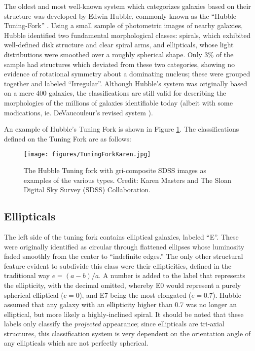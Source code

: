 The oldest and most well-known system which categorizes galaxies based on their structure was developed by Edwin Hubble, commonly known as the ``Hubble Tuning-Fork'' \citep{Hubble1926}. Using a small sample of photometric images of nearby galaxies, Hubble identified two fundamental morphological classes: spirals, which exhibited well-defined disk structure and clear spiral arms, and ellipticals, whose light distributions were smoothed over a roughly spherical shape. Only 3\% of the sample had structures which deviated from these two categories, showing no evidence of rotational symmetry about a dominating nucleus; these were grouped together and labeled ``Irregular''. Although Hubble's system was originally based on a mere 400 galaxies, the classifications are still valid for describing the morphologies of the millions of galaxies identifiable today (albeit with some modications, ie. DeVaucouleur's revised system \citep{DeVaucouleurs1963}).

An example of Hubble's Tuning Fork is shown in Figure \ref{fig:tuningfork}. The classifications defined on the Tuning Fork are as follows:

\begin{figure}
\centering
\texttt{[image: figures/TuningForkKaren.jpg]}
\label{fig:tuningfork}
\caption{The Hubble Tuning fork with gri-composite SDSS images as examples of the various types. Credit: Karen Masters and The Sloan Digital Sky Survey (SDSS) Collaboration.}
\end{figure}

\subsection{Ellipticals}

The left side of the tuning fork contains elliptical galaxies, labeled ``E''. These were originally identified as circular through flattened ellipses whose luminosity faded smoothly from the center to ``indefinite edges.'' The only other structural feature evident to subdivide this class were their ellipticities, defined in the traditional way $e=(a-b)/a$. A number is added to the label that represents the ellipticity, with the decimal omitted, whereby E0 would represent a purely spherical elliptical ($e=0$), and E7 being the most elongated ($e=0.7$). Hubble assumed that any galaxy with an ellipticity higher than 0.7 was no longer an elliptical, but more likely a highly-inclined spiral. It should be noted that these labels only classify the \emph{projected} appearance; since ellipticals are tri-axial structures, this classification system is very dependent on the orientation angle of any ellipticals which are not perfectly spherical.  

